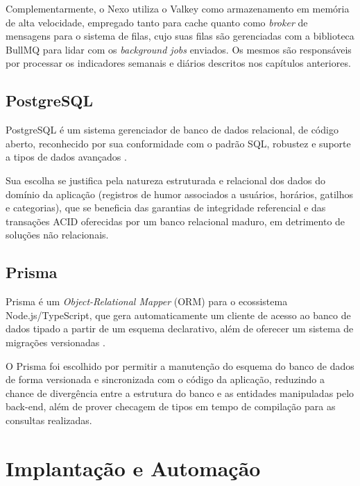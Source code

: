 Complementarmente, o Nexo utiliza o Valkey como armazenamento em memória de
alta velocidade, empregado tanto para cache quanto como \textit{broker} de
mensagens para o sistema de filas, cujo suas filas são gerenciadas com a
biblioteca BullMQ para lidar com os \textit{background jobs} enviados. Os
mesmos são responsáveis por processar os indicadores semanais e diários
descritos nos capítulos anteriores.

\subsection{PostgreSQL}

PostgreSQL é um sistema gerenciador de banco de dados relacional, de código
aberto, reconhecido por sua conformidade com o padrão SQL, robustez e suporte
a tipos de dados avançados \citep{postgresql:2026}.

Sua escolha se justifica pela natureza estruturada e relacional dos dados do
domínio da aplicação (registros de humor associados a usuários, horários,
gatilhos e categorias), que se beneficia das garantias de integridade
referencial e das transações ACID oferecidas por um banco relacional
maduro, em detrimento de soluções não relacionais.

\subsection{Prisma}

Prisma é um \textit{Object-Relational Mapper} (ORM) para o ecossistema
Node.js/TypeScript, que gera automaticamente um cliente de acesso ao banco de
dados tipado a partir de um esquema declarativo, além de oferecer um sistema
de migrações versionadas \citep{prisma:2026}.

O Prisma foi escolhido por permitir a manutenção do esquema do banco de dados
de forma versionada e sincronizada com o código da aplicação, reduzindo a
chance de divergência entre a estrutura do banco e as entidades manipuladas
pelo back-end, além de prover checagem de tipos em tempo de compilação para
as consultas realizadas.

\section{Implantação e Automação}

